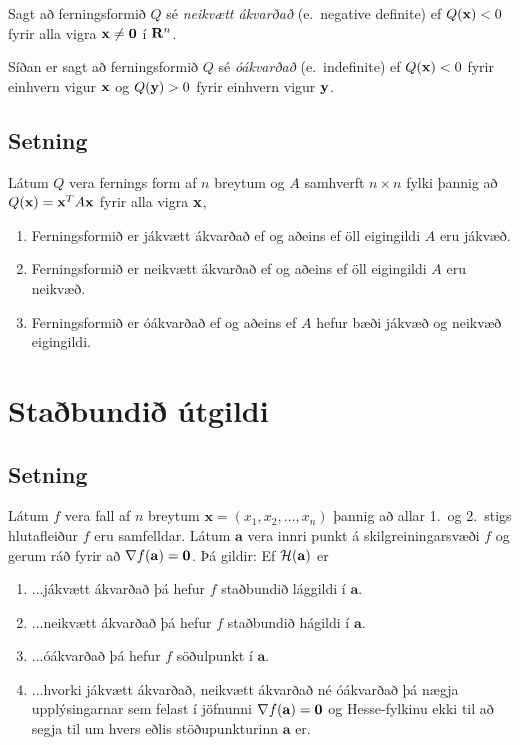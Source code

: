 \documentclass[a4paper,10pt,icelandic]{sphinxmanual}
\begin{document}
Sagt að ferningsformið \(Q\) sé \emph{neikvætt ákvarðað} (e. negative
definite) ef \(Q(\mbox{${\bf x}$})<0\) fyrir alla vigra
\(\mbox{${\bf x}$}\neq \mbox{${\bf 0}$}\) í
\(\mbox{${\bf R}^n$}\).

Síðan er sagt að ferningsformið \(Q\) sé \emph{óákvarðað} (e. indefinite)
ef \(Q(\mbox{${\bf x}$})<0\) fyrir einhvern vigur
\(\mbox{${\bf x}$}\) og \(Q(\mbox{${\bf y}$})>0\) fyrir einhvern
vigur \(\mbox{${\bf y}$}\).


\subsection{Setning}
\label{Kafli3:id8}
Látum \(Q\) vera fernings form af \(n\) breytum og \(A\)
samhverft \(n\times n\) fylki þannig að
\(Q(\mbox{${\bf x}$})=\mbox{${\bf x}$}^TA\mbox{${\bf x}$}\) fyrir
alla vigra \(\mbox{${\bf x}$}\),
\begin{enumerate}
\item {} 
Ferningsformið er jákvætt ákvarðað ef og aðeins ef öll eigingildi
\(A\) eru jákvæð.

\item {} 
Ferningsformið er neikvætt ákvarðað ef og aðeins ef öll eigingildi
\(A\) eru neikvæð.

\item {} 
Ferningsformið er óákvarðað ef og aðeins ef \(A\) hefur bæði
jákvæð og neikvæð eigingildi.

\end{enumerate}


\section{Staðbundið útgildi}
\label{Kafli3:id9}

\subsection{Setning}
\label{Kafli3:id10}
Látum \(f\) vera fall af \(n\) breytum
\(\mathbf{x} = (x_1,x_2,\ldots,x_n)\) þannig að allar 1. og 2. stigs
hlutafleiður \(f\) eru samfelldar. Látum \(\mathbf{a}\) vera
innri punkt á skilgreiningarsvæði \(f\) og gerum ráð fyrir að
\(\nabla
f(\mathbf{a})=\mbox{${\bf 0}$}\). Þá gildir: Ef
\({\cal H}(\mathbf{a})\) er
\begin{enumerate}
\item {} 
...jákvætt ákvarðað þá hefur \(f\) staðbundið lággildi í
\(\mathbf{a}\).

\item {} 
...neikvætt ákvarðað þá hefur \(f\) staðbundið hágildi í
\(\mathbf{a}\).

\item {} 
...óákvarðað þá hefur \(f\) söðulpunkt í \(\mathbf{a}\).

\item {} 
...hvorki jákvætt ákvarðað, neikvætt ákvarðað né óákvarðað þá nægja
upplýsingarnar sem felast í jöfnunni
\(\nabla f(\mathbf{a})=\mbox{${\bf 0}$}\) og Hesse-fylkinu ekki
til að segja til um hvers eðlis stöðupunkturinn \(\mathbf{a}\)
er.

\end{enumerate}
\end{document}

